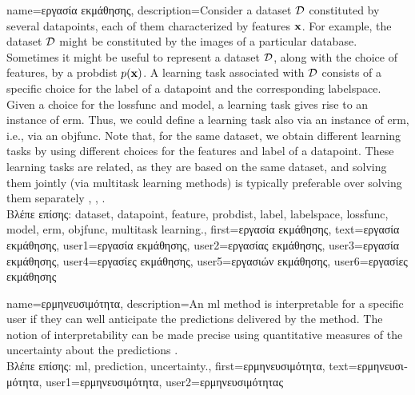 {name={\foreignlanguage{greek}{εργασία εκμάθησης}},
	description={Consider a \gls{dataset} $\mathcal{D}$ constituted by several \gls{datapoint}s, each of them 
	 characterized by \gls{feature}s ${\bf x}$. For example, the \gls{dataset} $\mathcal{D}$ 
	 might be constituted by the images of a particular database. Sometimes it might be useful 
	 to represent a \gls{dataset} $\mathcal{D}$, along with the choice of \gls{feature}s, by a \gls{probdist} $p({\bf x})$. 
	 A learning task associated with $\mathcal{D}$ consists of a specific 
	 choice for the \gls{label} of a \gls{datapoint} and the corresponding \gls{labelspace}. 
	 Given a choice for the \gls{lossfunc} and \gls{model}, a learning task gives rise to an 
	 instance of \gls{erm}. Thus, we could define a learning task also via an instance of \gls{erm}, i.e., 
	 via an \gls{objfunc}. Note that, for the same \gls{dataset}, we obtain different learning tasks by using 
	 different choices for the \gls{feature}s and \gls{label} of a \gls{datapoint}. These learning 
	 tasks are related, as they are based on the same \gls{dataset}, and solving them jointly 
	 (via \gls{multitask learning} methods) is typically preferable over solving them separately \cite{Caruana:1997wk}, \cite{JungGaphLassoSPL}, \cite{CSGraphSelJournal}.\\
	 \foreignlanguage{greek}{Βλέπε επίσης:} \gls{dataset}, \gls{datapoint}, \gls{feature}, \gls{probdist}, \gls{label}, \gls{labelspace}, \gls{lossfunc}, \gls{model}, \gls{erm}, \gls{objfunc}, \gls{multitask learning}.},
	first={\foreignlanguage{greek}{εργασία εκμάθησης}},
	text={\foreignlanguage{greek}{εργασία εκμάθησης}},
	user1={\foreignlanguage{greek}{εργασία εκμάθησης}}, %
	user2={\foreignlanguage{greek}{εργασίας εκμάθησης}}, %
	user3={\foreignlanguage{greek}{εργασία εκμάθησης}}, %
	user4={\foreignlanguage{greek}{εργασίες εκμάθησης}}, %
	user5={\foreignlanguage{greek}{εργασιών εκμάθησης}}, %
	user6={\foreignlanguage{greek}{εργασίες εκμάθησης}} %
}

{name={\foreignlanguage{greek}{ερμηνευσιμότητα}},
	description={An \gls{ml} method is interpretable for a specific user if 
			they can well anticipate the \gls{prediction}s delivered by the method. 
			The notion of interpretability can be made precise using quantitative 
			measures of the \gls{uncertainty} about the \gls{prediction}s \cite{JunXML2020}.\\
			\foreignlanguage{greek}{Βλέπε επίσης:} \gls{ml}, \gls{prediction}, \gls{uncertainty}.},
		first={\foreignlanguage{greek}{ερμηνευσιμότητα}},
		text={\foreignlanguage{greek}{ερμηνευσιμότητα}},
		user1={\foreignlanguage{greek}{ερμηνευσιμότητα}}, %
		user2={\foreignlanguage{greek}{ερμηνευσιμότητας}} %
}

